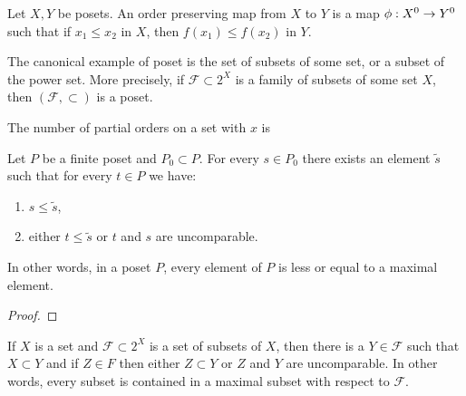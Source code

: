 \begin{definition}
	Let $X, Y$ be posets. An order preserving map from $X$ to $Y$ is a map $\phi:X^0 \rightarrow Y^0$ such that if $x_1 \leq x_2$ in $X$, then $f(x_1) \leq f(x_2)$ in $Y$.
\end{definition}

\begin{exmp}
	The canonical example of poset is the set of subsets of some set, or a subset of the power set. More precisely, if $\mathcal{F} \subset 2^X$ is a family of subsets of some set $X$, then $(\mathcal{F}, \subset)$ is a poset.
	
\end{exmp}


\begin{proposition}
	The number of partial orders on a set with $x$ is
\end{proposition}

\begin{lemma}
	Let $P$ be a finite poset and $P_0 \subset P$. For every $s \in P_0$ there exists an element $\tilde{s}$ such that for every $t \in P$ we have:
	
	\begin{enumerate}
		\item $s \leq \tilde{s}$,
		
		\item either $t \leq \tilde{s}$ or $t$ and $s$ are uncomparable.
	\end{enumerate}
	
	In other words, in a poset $P$, every element of $P$ is less or equal to a maximal element.
\end{lemma}

\begin{proof}
	
	
\end{proof}

\begin{coro}
	If $X$ is a set and $\mathcal{F} \subset 2^X$ is a set of subsets of $X$, then there is a $Y \in \mathcal{F}$ such that $X \subset Y$ and if $Z \in F$ then either $Z \subset Y$ or $Z$ and $Y$ are uncomparable. In other words, every subset is contained in a maximal subset with respect to $\mathcal{F}$.
\end{coro}






